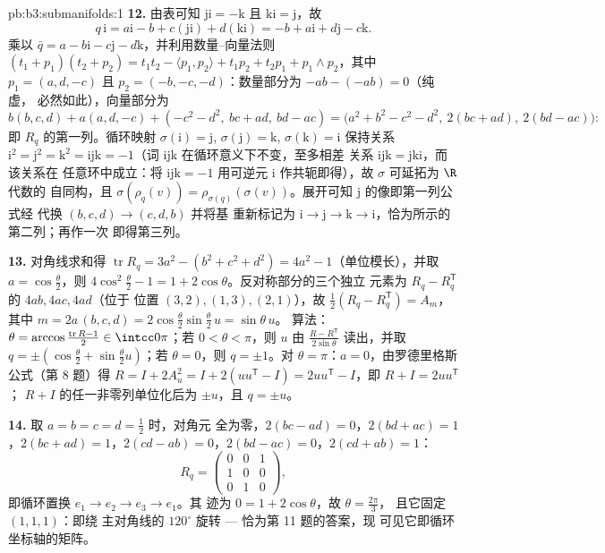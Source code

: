 \begin{solution}{pb:b3:submanifolds:1}
\textbf{12.} 由表可知 $\mathrm{ji} = -\mathrm k$ 且
$\mathrm{ki} = \mathrm j$，故
\[
q\,\mathrm i = a\mathrm i - b + c(\mathrm{ji}) +
d(\mathrm{ki}) = -b + a\mathrm i + d\mathrm j - c\mathrm k .
\]
乘以 $\bar q = a - b\mathrm i - c\mathrm j -
d\mathrm k$，并利用数量--向量法则 $(t_1 + p_1)(t_2 +
p_2) = t_1t_2 - \langle p_1, p_2\rangle + t_1p_2 + t_2p_1 +
p_1\wedge p_2$，其中 $p_1 = (a, d, -c)$ 且 $p_2 = (-b, -c,
-d)$：数量部分为 $-ab - (-ab) = 0$（纯虚，
必然如此），向量部分为
\[
b(b, c, d) + a(a, d, -c) + (-c^2 - d^2,\ bc + ad,\ bd - ac)
= \bigl(a^2 + b^2 - c^2 - d^2,\ 2(bc + ad),\ 2(bd -
ac)\bigr):
\]
即 $R_q$ 的第一列。循环映射 $\sigma(\mathrm i)
= \mathrm j$, $\sigma(\mathrm j) = \mathrm k$,
$\sigma(\mathrm k) = \mathrm i$ 保持关系
$\mathrm i^2 = \mathrm j^2 = \mathrm k^2 = \mathrm{ijk} =
-1$（词 $\mathrm{ijk}$ 在循环意义下不变，至多相差
关系 $\mathrm{ijk} = \mathrm{jki}$，而该关系在
任意环中成立：将 $\mathrm{ijk} = -1$ 用可逆元
$\mathrm i$ 作共轭即得），故 $\sigma$ 可延拓为 $\R$ 代数的
自同构，且 $\sigma(\rho_q(v)) =
\rho_{\sigma(q)}(\sigma(v))$。展开可知
$\mathrm j$ 的像即第一列公式经
代换 $(b, c, d) \to (c, d, b)$ 并将基
重新标记为 $\mathrm i \to \mathrm j \to \mathrm k \to \mathrm
i$，恰为所示的第二列；再作一次
即得第三列。

\textbf{13.} 对角线求和得 $\operatorname{tr}R_q =
3a^2 - (b^2 + c^2 + d^2) = 4a^2 - 1$（单位模长），并取
$a = \cos\frac\theta2$，则 $4\cos^2\frac\theta2 - 1 = 1 +
2\cos\theta$。反对称部分的三个独立
元素为 $R_q - R_q^{\mathsf T}$ 的 $4ab, 4ac, 4ad$（位于
位置 $(3,2), (1,3), (2,1)$），故 $\frac12(R_q -
R_q^{\mathsf T}) = A_m$，其中 $m = 2a\,(b, c, d) =
2\cos\frac\theta2\sin\frac\theta2\,u = \sin\theta\,u$。
算法：$\theta = \arccos\frac{\operatorname{tr}R -
1}{2} \in \intcc0\pi$；若 $0 < \theta < \pi$，则 $u$ 由
$\frac{R - R^{\mathsf T}}{2\sin\theta}$ 读出，并取 $q =
\pm(\cos\frac\theta2 + \sin\frac\theta2 u)$；若 $\theta =
0$，则 $q = \pm1$。对 $\theta = \pi$：$a = 0$，由罗德里格斯
公式（第 8 题）得 $R = I + 2A_u^2 = I + 2(uu^{\mathsf T} -
I) = 2uu^{\mathsf T} - I$，即 $R + I = 2uu^{\mathsf T}$；
$R + I$ 的任一非零列单位化后为 $\pm u$，且
$q = \pm u$。

\textbf{14.} 取 $a = b = c = d = \frac12$ 时，对角元
全为零，$2(bc - ad) = 0$，$2(bd + ac) = 1$，$2(bc +
ad) = 1$，$2(cd - ab) = 0$，$2(bd - ac) = 0$，$2(cd + ab) =
1$：
\[
R_q = \begin{pmatrix} 0 & 0 & 1\\ 1 & 0 & 0\\ 0 & 1 & 0
\end{pmatrix},
\]
即循环置换 $e_1 \to e_2 \to e_3 \to e_1$。其
迹为 $0 = 1 + 2\cos\theta$，故 $\theta = \frac{2\pi}3$，
且它固定 $(1,1,1)$：即绕
主对角线的 $120^\circ$ 旋转 --- 恰为第 11 题的答案，现
可见它即循环坐标轴的矩阵。


\end{solution}
